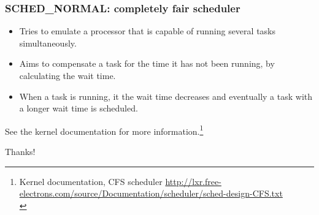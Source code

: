 \documentclass{beamer}
\begin{document}
\begin{frame}
\frametitle{SCHED\_NORMAL: completely fair scheduler}
\begin{itemize}
	\item Tries to emulate a processor that is capable of running several tasks simultaneously.
	\item Aims to compensate a task for the time it has not been running, by calculating the wait time. 
	\item When a task is running, it the wait time decreases and eventually a task with a longer wait time is scheduled.
\end{itemize}
See the kernel documentation for more information.\footnote{Kernel documentation, CFS scheduler \url{http://lxr.free-electrons.com/source/Documentation/scheduler/sched-design-CFS.txt} \\}

\end{frame}

\begin{frame}
\Huge{\centerline{Thanks!}}
\end{frame}
\end{document}
